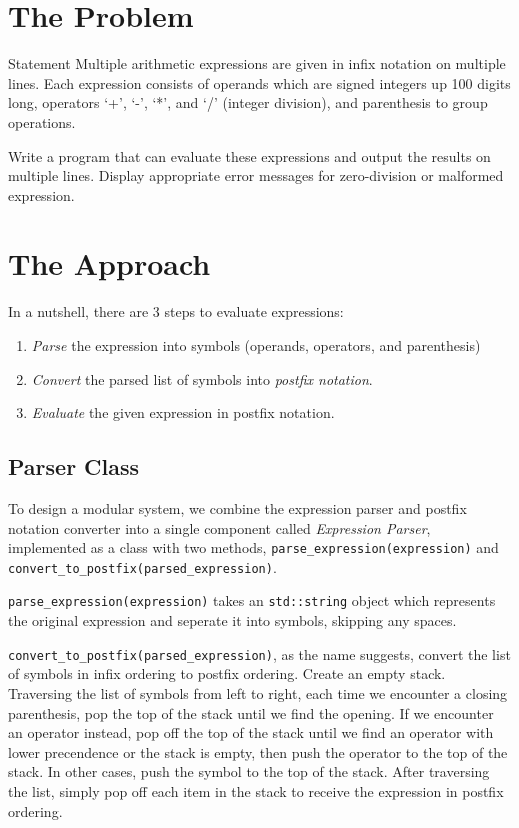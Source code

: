\documentclass{article}
\begin{document}
\section{The Problem}
\label{problem}

\begin{statement*}{Statement}{}
    Multiple arithmetic expressions are given in infix notation on multiple lines. Each expression consists of operands which are signed integers up 100 digits long, operators `+', `-', `*', and `/' (integer division), and parenthesis to group operations. 

    \indent Write a program that can evaluate these expressions and output the results on multiple lines. Display appropriate error messages for zero-division or malformed expression.
\end{statement*}

\section{The Approach}
\label{approach}

In a nutshell, there are 3 steps to evaluate expressions:
\begin{enumerate}
    \item \emph{Parse} the expression into symbols (operands, operators, and parenthesis)
    \item \emph{Convert} the parsed list of symbols into \emph{postfix notation}.
    \item \emph{Evaluate} the given expression in postfix notation.
\end{enumerate}

\subsection*{Parser Class}
\label{parser}

To design a modular system, we combine the expression parser and postfix notation converter into a single component called \emph{Expression Parser}, implemented as a class with two methods, \lstinline{parse_expression(expression)} and \lstinline{convert_to_postfix(parsed_expression)}.

\lstinline{parse_expression(expression)} takes an \lstinline{std::string} object which represents the original expression and seperate it into symbols, skipping any spaces.

\lstinline{convert_to_postfix(parsed_expression)}, as the name suggests, convert the list of symbols in infix ordering to postfix ordering. Create an empty stack. Traversing the list of symbols from left to right, each time we encounter a closing parenthesis, pop the top of the stack until we find the opening. If we encounter an operator instead, pop off the top of the stack until we find an operator with lower precendence or the stack is empty, then push the operator to the top of the stack. In other cases, push the symbol to the top of the stack. After traversing the list, simply pop off each item in the stack to receive the expression in postfix ordering.
\end{document}
